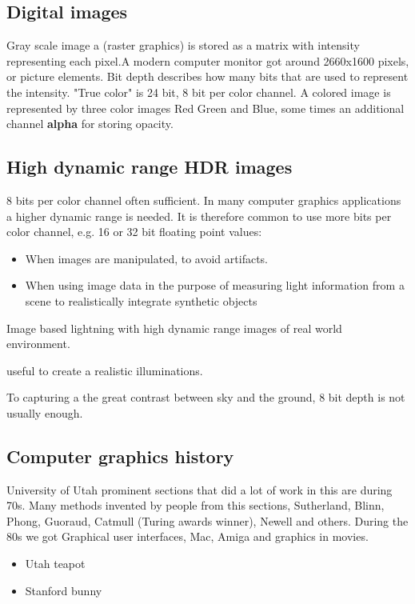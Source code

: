 \subsection*{Digital images}
Gray scale image a (raster graphics) is stored as a matrix with intensity representing each pixel.A modern computer monitor got around 2660x1600 pixels, or picture elements. Bit depth describes how many bits that are used to represent the intensity. "True color" is 24 bit, 8 bit per color channel. A colored image is represented by three color images Red Green and Blue, some times an additional channel \textbf{alpha} for storing opacity. 

\subsection*{High dynamic range \textbf{HDR} images}
8 bits per color channel often sufficient. In many computer graphics applications a higher dynamic range is needed. It is therefore common to use more bits per color channel, e.g. 16 or 32 bit floating point values: 

\begin{itemize}
	\item When images are manipulated, to avoid artifacts.
	\item When using image data in the purpose of measuring light information from a scene to realistically integrate synthetic objects 
\end{itemize}


Image based lightning with high dynamic range images of real world environment. 

useful to create a realistic illuminations. 

To capturing a the great contrast between sky and the ground, 8 bit depth is not usually enough.  

\subsection*{Computer graphics history}
University of Utah prominent sections that did a lot of work in this are during 70s. Many methods invented by people from this sections, Sutherland, Blinn, Phong, Guoraud, Catmull (Turing awards winner), Newell and others. During the 80s we got Graphical user interfaces, Mac, Amiga and graphics in movies. 

\begin{itemize}
	\item Utah teapot
	\item Stanford bunny
\end{itemize}


